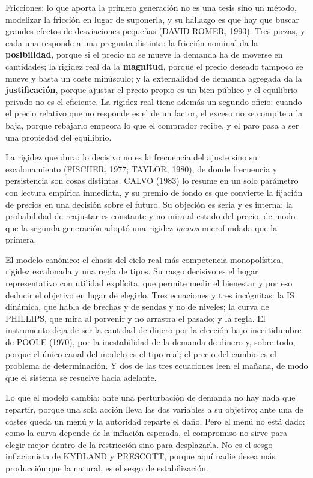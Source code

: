 \documentclass[10pt,a4paper]{article}
\newcommand{\puntosclave}[1]{%
  \begin{tcolorbox}[
    colframe=black,
    title={Puntos clave},
    before upper={\setlength{\parindent}{0.5cm}\setlength{\parskip}{0.5\baselineskip}}
  ]
  #1
  \end{tcolorbox}
}
\begin{document}
\puntosclave{
    Fricciones: lo que aporta la primera generación no es una tesis sino un método, modelizar la fricción en lugar de suponerla, y su hallazgo es que hay que buscar grandes efectos de desviaciones pequeñas (DAVID ROMER, 1993). Tres piezas, y cada una responde a una pregunta distinta: la fricción nominal da la \textbf{posibilidad}, porque si el precio no se mueve la demanda ha de moverse en cantidades; la rigidez real da la \textbf{magnitud}, porque el precio deseado tampoco se mueve y basta un coste minúsculo; y la externalidad de demanda agregada da la \textbf{justificación}, porque ajustar el precio propio es un bien público y el equilibrio privado no es el eficiente. La rigidez real tiene además un segundo oficio: cuando el precio relativo que no responde es el de un factor, el exceso no se compite a la baja, porque rebajarlo empeora lo que el comprador recibe, y el paro pasa a ser una propiedad del equilibrio.

    La rigidez que dura: lo decisivo no es la frecuencia del ajuste sino su escalonamiento (FISCHER, 1977; TAYLOR, 1980), de donde frecuencia y persistencia son cosas distintas. CALVO (1983) lo resume en un solo parámetro con lectura empírica inmediata, y su premio de fondo es que convierte la fijación de precios en una decisión sobre el futuro. Su objeción es seria y es interna: la probabilidad de reajustar es constante y no mira al estado del precio, de modo que la segunda generación adoptó una rigidez \textit{menos} microfundada que la primera.

    El modelo canónico: el chasis del ciclo real más competencia monopolística, rigidez escalonada y una regla de tipos. Su rasgo decisivo es el hogar representativo con utilidad explícita, que permite medir el bienestar y por eso deducir el objetivo en lugar de elegirlo. Tres ecuaciones y tres incógnitas: la IS dinámica, que habla de brechas y de sendas y no de niveles; la curva de PHILLIPS, que mira al porvenir y no arrastra el pasado; y la regla. El instrumento deja de ser la cantidad de dinero por la elección bajo incertidumbre de POOLE (1970), por la inestabilidad de la demanda de dinero y, sobre todo, porque el único canal del modelo es el tipo real; el precio del cambio es el problema de determinación. Y dos de las tres ecuaciones leen el mañana, de modo que el sistema se resuelve hacia adelante.

    Lo que el modelo cambia: ante una perturbación de demanda no hay nada que repartir, porque una sola acción lleva las dos variables a su objetivo; ante una de costes queda un menú y la autoridad reparte el daño. Pero el menú no está dado: como la curva depende de la inflación esperada, el compromiso no sirve para elegir mejor dentro de la restricción sino para desplazarla. No es el sesgo inflacionista de KYDLAND y PRESCOTT, porque aquí nadie desea más producción que la natural, es el sesgo de estabilización.
}
\end{document}
